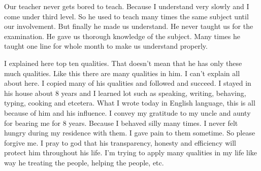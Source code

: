 Our teacher never gets bored to teach. Because I understand very slowly and I come under third level. So he used to teach many times the same subject until our involvement. But finally he made us understand. He never taught us for the examination. He gave us thorough knowledge of the subject. Many times he taught one line for whole month to make us understand properly.

I explained here top ten qualities. That doesn’t mean that he has only these much qualities. Like this there are many qualities in him. I can’t explain all about here. I copied many of his qualities and followed and succeed. I stayed in his house about 8 years and I learned lot such as speaking, writing, behaving, typing, cooking and etcetera. What I wrote today in English language, this is all because of him and his influence. I convey my gratitude to my uncle and aunty for bearing me for 8 years. Because I behaved silly many times. I never felt hungry during my residence with them. I gave pain to them sometime. So please forgive me. I pray to god that his transparency, honesty and efficiency will protect him throughout his life. I’m trying to apply many qualities in my life like way he treating the people, helping the people, etc.
 
